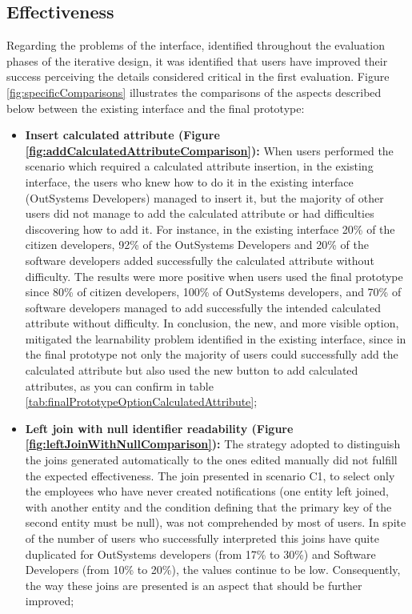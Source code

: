 \subsection{Effectiveness}
\label{subsec:effectiveness}

Regarding the problems of the interface, identified throughout the evaluation phases of the iterative design, it was identified that users have improved their success perceiving the details considered critical in the first evaluation. Figure \ref{fig:specificComparisons} illustrates the comparisons of the aspects described below between the existing interface and the final prototype:

\begin{itemize}
  \item \textbf{Insert calculated attribute (Figure \ref{fig:addCalculatedAttributeComparison}): } When users performed the scenario which required a calculated attribute insertion, in the existing interface, the users who knew how to do it in the existing interface (OutSystems Developers) managed to insert it, but the majority of other users did not manage to add the calculated attribute or had difficulties discovering how to add it. For instance, in the existing interface 20\% of the citizen developers, 92\% of the OutSystems Developers and 20\% of the software developers added successfully the calculated attribute without difficulty. The results were more positive when users used the final prototype since 80\% of citizen developers, 100\% of OutSystems developers, and 70\% of software developers managed to add successfully the intended calculated attribute without difficulty. In conclusion, the new, and more visible option, mitigated the learnability problem identified in the existing interface, since in the final prototype not only the majority of users could successfully add the calculated attribute but also used the new button to add calculated attributes, as you can confirm in table \ref{tab:finalPrototypeOptionCalculatedAttribute};
  \item \textbf{Left join with null identifier readability (Figure \ref{fig:leftJoinWithNullComparison}): } The strategy adopted to distinguish the joins generated automatically to the ones edited manually did not fulfill the expected effectiveness. The join presented in scenario C1, to select only the employees who have never created notifications (one entity left joined, with another entity and the condition defining that the primary key of the second entity must be null), was not comprehended by most of users. In spite of the number of users who successfully interpreted this joins have quite duplicated for OutSystems developers (from 17\% to 30\%) and Software Developers (from 10\% to 20\%), the values continue to be low. Consequently, the way these joins are presented is an aspect that should be further improved;

\end{itemize}
